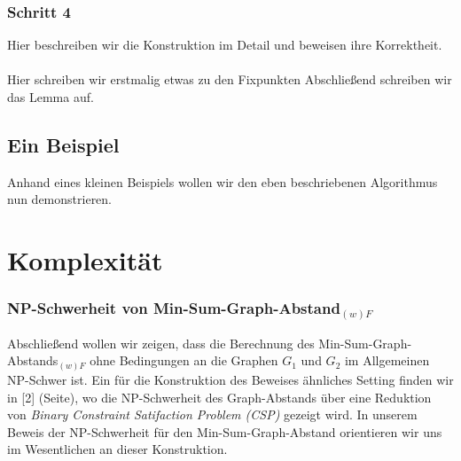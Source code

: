 \documentclass[a4paper, 12pt, twoside]{article}
\theoremstyle{Format1} %
\begin{document}
\subsubsection{Schritt 4}
Hier beschreiben wir die Konstruktion im Detail und beweisen ihre Korrektheit.
\\
\\
Hier schreiben wir erstmalig etwas zu den Fixpunkten
Abschließend schreiben wir das Lemma auf.

\subsection{Ein Beispiel}
Anhand eines kleinen Beispiels wollen wir den eben beschriebenen Algorithmus nun demonstrieren.

\section{Komplexität}

\subsubsection{NP-Schwerheit von Min-Sum-Graph-Abstand$_{(w)F}$}

Abschließend wollen wir zeigen, dass die Berechnung des Min-Sum-Graph-Abstands$_{(w)F}$ ohne Bedingungen an die Graphen $G_1$ und $G_2$ im Allgemeinen
NP-Schwer ist. Ein für die Konstruktion des Beweises ähnliches Setting finden wir in [2] (Seite), wo die NP-Schwerheit des Graph-Abstands
über eine Reduktion von \textit{Binary Constraint Satifaction Problem (CSP)} gezeigt wird.
In unserem Beweis der NP-Schwerheit für den Min-Sum-Graph-Abstand orientieren wir uns im Wesentlichen an dieser Konstruktion.
\end{document}

